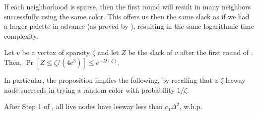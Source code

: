 If each neighborhood is sparse, then the first round will result in many neighbors successfully using the same color. 
This offers us then the same slack as if we had a larger palette in advance (as proved by \cite{EPS15}), resulting in the same logarithmic time complexity.

\begin{proposition}[\cite{EPS15}, Lemma 3.1]
Let $v$ be a vertex of sparsity $\zeta$ and let $Z$ be the slack of $v$ after the first round of . Then, 
 $\Pr[Z \le \zeta/(4 e^3)] \le e^{-\Omega(\zeta)}$.
\label{P:sparsity}
\end{proposition}

In particular, the proposition implies the following, by recalling that a $\zeta$-leeway node succeeds in trying a random color with probability $1/\zeta$.

\begin{observation}
After Step 1 of , all live nodes have leeway less than $c_1 \Delta^2$, w.h.p.
\label{O:sparse}
\end{observation}

